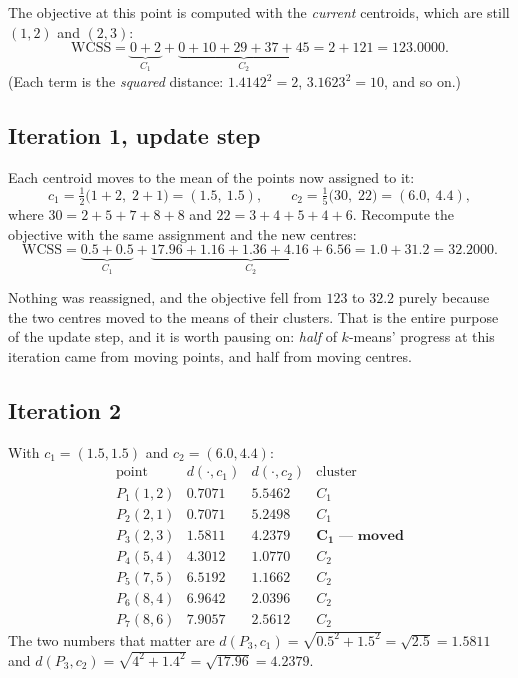 \documentclass[11pt]{article}
\begin{document}
The objective at this point is computed with the \emph{current} centroids,
which are still $(1,2)$ and $(2,3)$:
\[
  \mathrm{WCSS} = \underbrace{0 + 2}_{C_1}
  + \underbrace{0 + 10 + 29 + 37 + 45}_{C_2} = 2 + 121 = 123.0000 .
\]
(Each term is the \emph{squared} distance: $1.4142^2 = 2$, $3.1623^2 = 10$,
and so on.)

\subsection{Iteration 1, update step}

Each centroid moves to the mean of the points now assigned to it:
\[
  c_1 = \tfrac12\bigl(1{+}2,\; 2{+}1\bigr) = (1.5,\ 1.5),
  \qquad
  c_2 = \tfrac15\bigl(30,\; 22\bigr) = (6.0,\ 4.4),
\]
where $30 = 2{+}5{+}7{+}8{+}8$ and $22 = 3{+}4{+}5{+}4{+}6$.
Recompute the objective with the same assignment and the new centres:
\[
  \mathrm{WCSS} = \underbrace{0.5 + 0.5}_{C_1}
  + \underbrace{17.96 + 1.16 + 1.36 + 4.16 + 6.56}_{C_2}
  = 1.0 + 31.2 = 32.2000 .
\]

Nothing was reassigned, and the objective fell from $123$ to $32.2$ purely
because the two centres moved to the means of their clusters. That is the
entire purpose of the update step, and it is worth pausing on: \emph{half} of
$k$-means' progress at this iteration came from moving points, and half from
moving centres.

\subsection{Iteration 2}

\begin{worked}
With $c_1 = (1.5, 1.5)$ and $c_2 = (6.0, 4.4)$:
\[
\begin{array}{lccl}
  \text{point} & d(\cdot, c_1) & d(\cdot, c_2) & \text{cluster}\\[2pt]
  P_1 (1,2) & 0.7071 & 5.5462 & C_1\\
  P_2 (2,1) & 0.7071 & 5.2498 & C_1\\
  P_3 (2,3) & \mathbf{1.5811} & \mathbf{4.2379} & \mathbf{C_1 \text{ --- moved}}\\
  P_4 (5,4) & 4.3012 & 1.0770 & C_2\\
  P_5 (7,5) & 6.5192 & 1.1662 & C_2\\
  P_6 (8,4) & 6.9642 & 2.0396 & C_2\\
  P_7 (8,6) & 7.9057 & 2.5612 & C_2
\end{array}
\]
The two numbers that matter are
$d(P_3, c_1) = \sqrt{0.5^2 + 1.5^2} = \sqrt{2.5} = 1.5811$ and
$d(P_3, c_2) = \sqrt{4^2 + 1.4^2} = \sqrt{17.96} = 4.2379$.
\end{worked}
\end{document}
